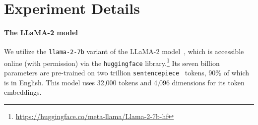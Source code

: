 \documentclass{article}
\theoremstyle{plain}
\theoremstyle{definition}
\theoremstyle{remark}
\begin{document}
\section{Experiment Details}\label{sec:exp_details}

\paragraph{The LLaMA-2 model}
We utilize the \texttt{llama-2-7b} variant of the LLaMA-2 model~\citep{touvron2023llama2}, which is accessible online (with permission) via the \texttt{huggingface} library.\footnote{\url{https://huggingface.co/meta-llama/Llama-2-7b-hf}}
Its seven billion parameters are pre-trained on two trillion \texttt{sentencepiece}~\citep{kudo2018sentencepiece} tokens, 90\% of which is in English. 
This model uses 32,000 tokens and 4,096 dimensions for its token embeddings.
\end{document}
